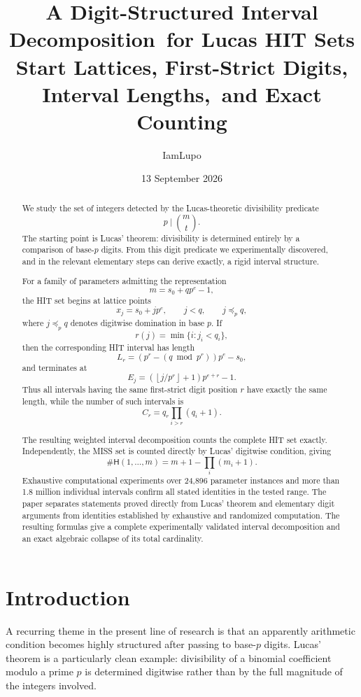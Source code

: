 \documentclass[11pt,a4paper]{article}
\title{\textbf{A Digit-Structured Interval Decomposition\ for Lucas HIT Sets}\\
\large Start Lattices, First-Strict Digits, Interval Lengths,\ and Exact Counting}
\author{IamLupo}
\date{13 September 2026}
\theoremstyle{definition}
\theoremstyle{remark}
\newcommand{\hit}{\mathsf{H}}
\begin{document}
\maketitle

\begin{abstract}
We study the set of integers detected by the Lucas-theoretic divisibility predicate
\[
 p \mid \binom{m}{t}.
\]  The starting point is Lucas' theorem: divisibility is determined entirely by a comparison of base-$p$ digits.  From this digit predicate we experimentally discovered, and in the relevant elementary steps can derive exactly, a rigid interval structure.

For a family of parameters admitting the representation
\[
 m=s_0+q p^e-1,
\]
the HIT set begins at lattice points
\[
 x_j=s_0+jp^e,
\qquad
j<q,\qquad j\preceq_p q,
\]
where $j\preceq_p q$ denotes digitwise domination in base $p$.  If
\[
 r(j)=\min\{i:j_i<q_i\},
\]
then the corresponding HIT interval has length
\[
 L_{r}=
 \left(p^r-(q\bmod p^r)\right)p^e-s_0,
\]
and terminates at
\[
 E_j=
 \left(\left\lfloor j/p^r\right\rfloor+1\right)p^{e+r}-1.
\]
Thus all intervals having the same first-strict digit position $r$ have exactly the same length, while the number of such intervals is
\[
 C_r=q_r\prod_{i>r}(q_i+1).
\]

The resulting weighted interval decomposition counts the complete HIT set exactly. Independently, the MISS set is counted directly by Lucas' digitwise condition, giving
\[
 \#\hit(1,\dots,m)
 =m+1-\prod_i(m_i+1).
\]
Exhaustive computational experiments over 24,896 parameter instances and more than 1.8 million individual intervals confirm all stated identities in the tested range. The paper separates statements proved directly from Lucas' theorem and elementary digit arguments from identities established by exhaustive and randomized computation. The resulting formulas give a complete experimentally validated interval decomposition and an exact algebraic collapse of its total cardinality.
\end{abstract}

\section{Introduction}

A recurring theme in the present line of research is that an apparently arithmetic condition becomes highly structured after passing to base-$p$ digits.  Lucas' theorem is a particularly clean example: divisibility of a binomial coefficient modulo a prime $p$ is determined digitwise rather than by the full magnitude of the integers involved.
\end{document}
